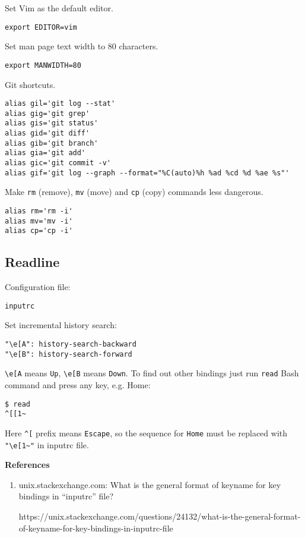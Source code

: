 \documentclass[12pt,a4paper]{article}
\begin{document}
Set Vim as the default editor.

\begin{verbatim}
export EDITOR=vim
\end{verbatim}

Set man page text width to 80 characters.

\begin{verbatim}
export MANWIDTH=80
\end{verbatim}

Git shortcuts.

\begin{verbatim}
alias gil='git log --stat'
alias gig='git grep'
alias gis='git status'
alias gid='git diff'
alias gib='git branch'
alias gia='git add'
alias gic='git commit -v'
alias gif='git log --graph --format="%C(auto)%h %ad %cd %d %ae %s"'
\end{verbatim}

Make \texttt{rm} (remove), \texttt{mv} (move) and \texttt{cp} (copy) commands less dangerous.

\begin{verbatim}
alias rm='rm -i'
alias mv='mv -i'
alias cp='cp -i'
\end{verbatim}

\subsection{Readline}

Configuration file:

\begin{verbatim}
inputrc
\end{verbatim}

Set incremental history search:
\begin{verbatim}
"\e[A": history-search-backward
"\e[B": history-search-forward
\end{verbatim}

\verb"\e[A" means \verb"Up", \verb"\e[B" means \verb"Down".  To find out other 
bindings just run \verb"read" Bash command and press any key, e.g. Home:
\begin{verbatim}
$ read
^[[1~
\end{verbatim}

Here \verb"^[" prefix means \verb"Escape", so the sequence for \verb"Home" must 
be replaced with \verb'"\e[1~"' in inputrc file.

\textbf{References}

\begin{enumerate}
\item unix.stackexchange.com: What is the general format of keyname for key 
bindings in “inputrc” file?

	https://unix.stackexchange.com/questions/24132/what-is-the-general-format-of-keyname-for-key-bindings-in-inputrc-file
\end{enumerate}
\end{document}
